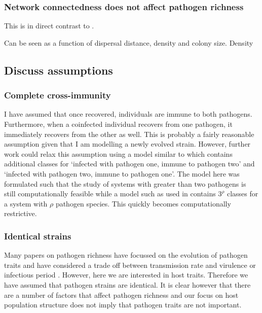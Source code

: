 \subsubsection{Network connectedness does not affect pathogen richness}

This is in direct contrast to \cite{campos2006pathogen}. 

Can be seen as a function of dispersal distance, density and colony size.
Density 


\subsection{Discuss assumptions}

\subsubsection{Complete cross-immunity}

I have assumed that once recovered, individuals are immune to both pathogens. 
Furthermore, when a coinfected individual recovers from one pathogen, it immediately recovers from the other as well.
This is probably a fairly reasonable assumption given that I am modelling a newly evolved strain.
However, further work could relax this assumption using a model similar to \cite{poletto2015characterising} which contains additional classes for `infected with pathogen one, immune to pathogen two' and `infected with pathogen two, immune to pathogen one'.
The model here was formulated such that the study of systems with greater than two pathogens is still computationally feasible while a model such as used in \cite{poletto2015characterising} contains $3^\rho$ classes for a system with $\rho$ pathogen species.
This quickly becomes computationally restrictive.

\subsubsection{Identical strains}

Many papers on pathogen richness have focussed on the evolution of pathogen traits and have considered a trade off between transmission rate and virulence \cite{nowak1994superinfection, nowak1994superinfection} or infectious period \cite{poletto2013hostinfec}.
However, here we are interested in host traits.
Therefore we have assumed that pathogen strains are identical.
It is clear however that there are a number of factors that affect pathogen richness and our focus on host population structure does not imply that pathogen traits are not important.



